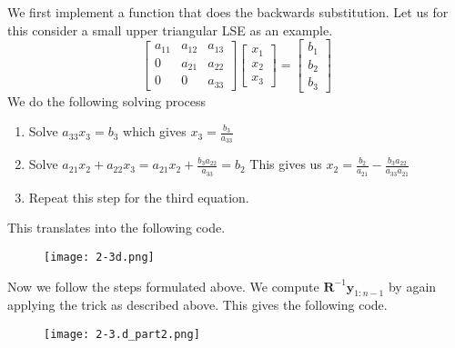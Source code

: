 \documentclass{article}
\begin{document}
\pagebreak

\noindent We first implement a function that does the backwards substitution. Let us for this consider a small upper triangular LSE as an example.
\begin{equation*}
    \begin{bmatrix}
        a_{11} & a_{12} & a_{13} \\
        0 & a_{21} & a_{22} \\
        0 & 0 & a_{33}
    \end{bmatrix}
    \begin{bmatrix}
        x_{1} \\
        x_{2} \\
        x_{3}
    \end{bmatrix}
    = \begin{bmatrix}
        b_{1} \\
        b_{2} \\
        b_{3}
    \end{bmatrix}
\end{equation*}
We do the following solving process
\begin{enumerate}
    \item Solve $a_{33}x_{3} = b_{3}$ which gives $x_{3} = \frac{b_{3}}{a_{33}}$
    \item Solve $a_{21}x_{2} + a_{22}x_{3}  = a_{21}x_{2} +\frac{b_{3}a_{22}}{a_{33}} = b_{2}$ This gives us $x_{2} = \frac{b_{2}}{a_{21}}-\frac{b_{3}a_{22}}{a_{33}a_{21}}$
    \item Repeat this step for the third equation.
\end{enumerate}
This translates into the following code.

\begin{figure}[!hbt]
    \centering
\texttt{[image: 2-3d.png]}
\end{figure}

\noindent Now we follow the steps formulated above. We compute $\mathbf{R}^{-1}\mathbf{y}_{1:n-1}$ by again applying the trick as described above. This gives the following code.

\begin{figure}[!hbt]
    \centering
\texttt{[image: 2-3.d\_part2.png]}
\end{figure}
\end{document}
